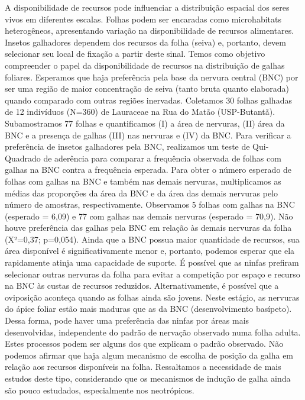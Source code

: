 \documentclass[
]{book}
\begin{document}
A disponibilidade de recursos pode influenciar a distribuição espacial dos seres vivos em diferentes escalas. Folhas podem ser encaradas como microhabitats heterogêneos, apresentando variação na disponibilidade de recursos alimentares. Insetos galhadores dependem dos recursos da folha (seiva) e, portanto, devem selecionar seu local de fixação a partir deste sinal. Temos como objetivo compreender o papel da disponibilidade de recursos na distribuição de galhas foliares. Esperamos que haja preferência pela base da nervura central (BNC) por ser uma região de maior concentração de seiva (tanto bruta quanto elaborada) quando comparado com outras regiões inervadas. Coletamos 30 folhas galhadas de 12 indivíduos (N=360) de Lauraceae na Rua do Matão (USP-Butantã). Subamostramos 77 folhas e quantificamos (I) a área de nervuras, (II) área da BNC e a presença de galhas (III) nas nervuras e (IV) da BNC. Para verificar a preferência de insetos galhadores pela BNC, realizamos um teste de Qui-Quadrado de aderência para comparar a frequência observada de folhas com galhas na BNC contra a frequência esperada. Para obter o número esperado de folhas com galhas na BNC e também nas demais nervuras, multiplicamos as médias das proporções da área da BNC e da área das demais nervuras pelo número de amostras, respectivamente. Observamos 5 folhas com galhas na BNC (esperado = 6,09) e 77 com galhas nas demais nervuras (esperado = 70,9). Não houve preferência das galhas pela BNC em relação às demais nervuras da folha (X²=0,37; p=0,054). Ainda que a BNC possua maior quantidade de recursos, sua área disponível é significativamente menor e, portanto, podemos esperar que ela rapidamente atinja uma capacidade de suporte. É possível que as ninfas prefiram selecionar outras nervuras da folha para evitar a competição por espaço e recurso na BNC às custas de recursos reduzidos. Alternativamente, é possível que a oviposição aconteça quando as folhas ainda são jovens. Neste estágio, as nervuras do ápice foliar estão mais maduras que as da BNC (desenvolvimento basípeto). Dessa forma, pode haver uma preferência das ninfas por áreas mais desenvolvidas, independente do padrão de nervação observado numa folha adulta. Estes processos podem ser alguns dos que explicam o padrão observado. Não podemos afirmar que haja algum mecanismo de escolha de posição da galha em relação aos recursos disponíveis na folha. Ressaltamos a necessidade de mais estudos deste tipo, considerando que os mecanismos de indução de galha ainda são pouco estudados, especialmente nos neotrópicos.
\end{document}
